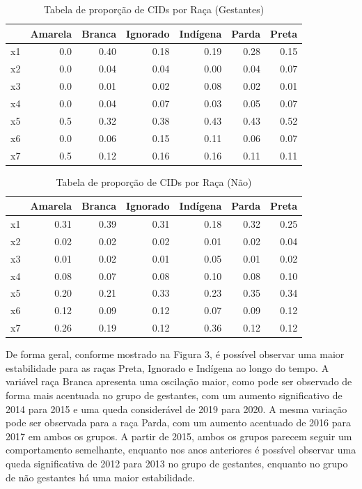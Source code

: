 \documentclass[
]{article}
\begin{document}
\begin{table}

\caption{\label{tab:unnamed-chunk-5}Tabela de proporção de CIDs por Raça (Gestantes)}
\centering
\begin{tabular}[t]{l|r|r|r|r|r|r}
\hline
  & Amarela & Branca & Ignorado & Indígena & Parda & Preta\\
\hline
x1 & 0.0 & 0.40 & 0.18 & 0.19 & 0.28 & 0.15\\
\hline
x2 & 0.0 & 0.04 & 0.04 & 0.00 & 0.04 & 0.07\\
\hline
x3 & 0.0 & 0.01 & 0.02 & 0.08 & 0.02 & 0.01\\
\hline
x4 & 0.0 & 0.04 & 0.07 & 0.03 & 0.05 & 0.07\\
\hline
x5 & 0.5 & 0.32 & 0.38 & 0.43 & 0.43 & 0.52\\
\hline
x6 & 0.0 & 0.06 & 0.15 & 0.11 & 0.06 & 0.07\\
\hline
x7 & 0.5 & 0.12 & 0.16 & 0.16 & 0.11 & 0.11\\
\hline
\end{tabular}
\end{table}

\begin{table}

\caption{\label{tab:unnamed-chunk-5}Tabela de proporção de CIDs por Raça  (Não)}
\centering
\begin{tabular}[t]{l|r|r|r|r|r|r}
\hline
  & Amarela & Branca & Ignorado & Indígena & Parda & Preta\\
\hline
x1 & 0.31 & 0.39 & 0.31 & 0.18 & 0.32 & 0.25\\
\hline
x2 & 0.02 & 0.02 & 0.02 & 0.01 & 0.02 & 0.04\\
\hline
x3 & 0.01 & 0.02 & 0.01 & 0.05 & 0.01 & 0.02\\
\hline
x4 & 0.08 & 0.07 & 0.08 & 0.10 & 0.08 & 0.10\\
\hline
x5 & 0.20 & 0.21 & 0.33 & 0.23 & 0.35 & 0.34\\
\hline
x6 & 0.12 & 0.09 & 0.12 & 0.07 & 0.09 & 0.12\\
\hline
x7 & 0.26 & 0.19 & 0.12 & 0.36 & 0.12 & 0.12\\
\hline
\end{tabular}
\end{table}

De forma geral, conforme mostrado na Figura 3, é possível observar uma
maior estabilidade para as raças Preta, Ignorado e Indígena ao longo do
tempo. A variável raça Branca apresenta uma oscilação maior, como pode
ser observado de forma mais acentuada no grupo de gestantes, com um
aumento significativo de 2014 para 2015 e uma queda considerável de 2019
para 2020. A mesma variação pode ser observada para a raça Parda, com um
aumento acentuado de 2016 para 2017 em ambos os grupos. A partir de
2015, ambos os grupos parecem seguir um comportamento semelhante,
enquanto nos anos anteriores é possível observar uma queda significativa
de 2012 para 2013 no grupo de gestantes, enquanto no grupo de não
gestantes há uma maior estabilidade.
\end{document}
